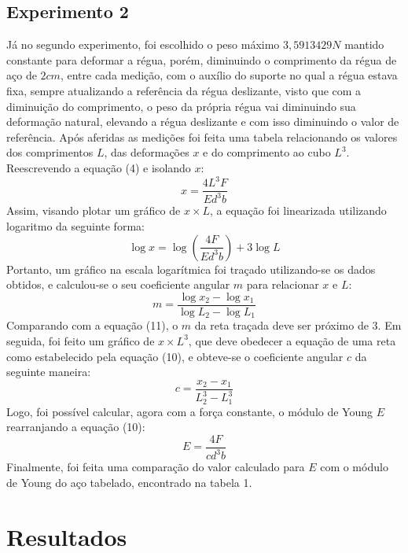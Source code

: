 \documentclass{article}
\begin{document}
\subsection{Experimento 2}
Já no segundo experimento, foi escolhido o peso máximo $3,5913429 N$ mantido constante para deformar a régua, porém, diminuindo o comprimento da régua de aço de $2cm$, entre cada medição, com o auxílio do suporte no qual a régua estava fixa, sempre atualizando a referência da régua deslizante, visto que com a diminuição do comprimento, o peso da própria régua vai diminuindo sua deformação natural, elevando a régua deslizante e com isso diminuindo o valor de referência. Após aferidas as medições foi feita uma tabela relacionando os valores dos comprimentos $L$, das deformações $x$ e do comprimento ao cubo $L^3$.
Reescrevendo a equação (4) e isolando $x$:
\begin{equation}
    x = \frac{4L^3F}{Ed^3b}
\end{equation}
Assim, visando plotar um gráfico de $x \times L$, a equação foi linearizada utilizando logaritmo da seguinte forma:
\begin{equation}
    \log x = \log {\left(\frac{4F}{Ed^3b}\right)} + 3\log L 
\end{equation}
Portanto, um gráfico na escala logarítmica foi traçado utilizando-se os dados obtidos, e calculou-se o seu coeficiente angular $m$ para relacionar $x$ e $L$:
\begin{equation}
    m = \frac{\log x_2 - \log x_1}{\log L_2 - \log L_1}
\end{equation}
Comparando com a equação (11), o $m$ da reta traçada deve ser próximo de 3.
Em seguida, foi feito um gráfico de $x \times L^3$, que deve obedecer a equação de uma reta como estabelecido pela equação (10), e obteve-se o coeficiente angular $c$ da seguinte maneira:
\begin{equation}
    c = \frac{x_2 - x_1}{L^3_2 - L^3_1}
\end{equation}
Logo, foi possível calcular, agora com a força constante, o módulo de Young $E$ rearranjando a equação (10):
\begin{equation}
    E = \frac{4F}{cd^3b}
\end{equation}
Finalmente, foi feita uma comparação do valor calculado para $E$ com o módulo de Young do aço tabelado, encontrado na tabela 1.

\section{Resultados}
\end{document}
